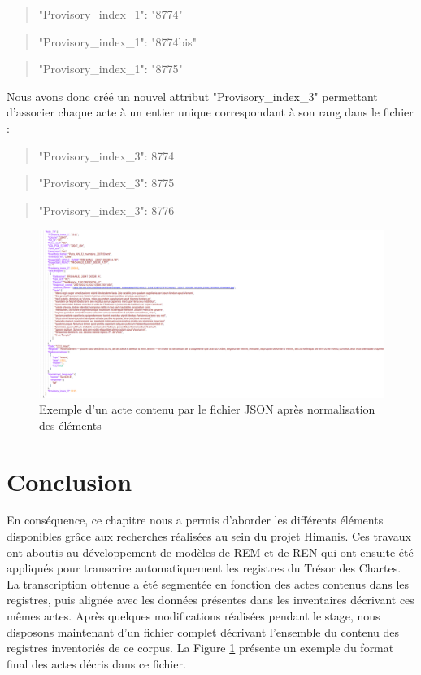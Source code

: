 \documentclass[a4paper,12pt,twoside]{book}
\begin{document}
	\begin{quotation}
		"Provisory\_index\_1": "8774"
	\end{quotation}
	
	\begin{quotation}
		"Provisory\_index\_1": "8774bis"
	\end{quotation}

	\begin{quotation}
		"Provisory\_index\_1": "8775"
	\end{quotation}
	
	\noindent Nous avons donc créé un nouvel attribut "Provisory\_index\_3" permettant d'associer chaque acte à un entier unique correspondant à son rang dans le fichier :
	
	\begin{quotation}
		"Provisory\_index\_3": 8774
	\end{quotation}

	\begin{quotation}
		"Provisory\_index\_3": 8775
	\end{quotation}
	
	\begin{quotation}
		"Provisory\_index\_3": 8776
	\end{quotation}

	\begin{figure}
		\centering
		\includegraphics[width=\textwidth]{Images/json_modifie.png}
		\caption{Exemple d'un acte contenu par le fichier JSON après normalisation des éléments}
		\label{json_final}
	\end{figure}
	
	
	\section*{Conclusion}
	
	En conséquence, ce chapitre nous a permis d'aborder les différents éléments disponibles grâce aux recherches réalisées au sein du projet Himanis. Ces travaux ont aboutis au développement de modèles de REM et de REN qui ont ensuite été appliqués pour transcrire automatiquement les registres du Trésor des Chartes. La transcription obtenue a été segmentée en fonction des actes contenus dans les registres, puis alignée avec les données présentes dans les inventaires décrivant ces mêmes actes. Après quelques modifications réalisées pendant le stage, nous disposons maintenant d'un fichier complet décrivant l'ensemble du contenu des registres inventoriés de ce corpus. La Figure \ref{json_final} présente un exemple du format final des actes décris dans ce fichier.
	
\end{document}
